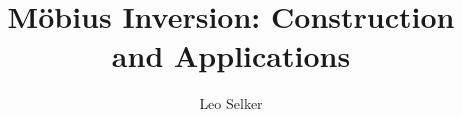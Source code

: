 \documentclass[12pt]{pom_thesis}
\author{Leo Selker}
\title{M\"obius Inversion: Construction and Applications}
\begin{document}
\maketitle

\begin{abstract} %
\end{abstract}

\tableofcontents
\end{document}
